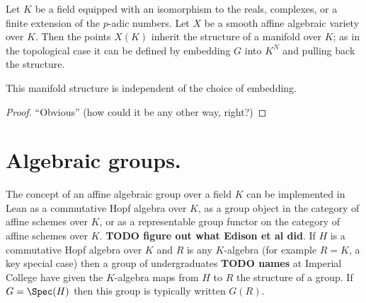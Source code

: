 \begin{definition}\label{manifold_on_algebraic_variety_points} Let $K$ be a field equipped with an isomorphism to the reals, complexes, or a finite extension of the $p$-adic numbers. Let $X$ be a smooth affine algebraic variety over $K$. Then the points $X(K)$ inherit the structure of a manifold over $K$; as in the topological case it can be defined by embedding $G$ into $K^N$ and pulling back the structure.
\end{definition}

\begin{theorem}\label{manifold_on_algebraic_variety_well_defined} This manifold structure is independent of the choice of embedding.
\end{theorem}
\begin{proof} ``Obvious'' (how could it be any other way, right?)
\end{proof}

\section{Algebraic groups.}

The concept of an affine algebraic group over a field $K$ can be implemented in Lean as a commutative Hopf algebra over $K$, as a group object in the category of affine schemes over $K$, or as a representable group functor on the category of affine schemes over $K$. {\bf TODO figure out what Edison et al did}. If $H$ is a commutative Hopf algebra over $K$ and $R$ is any $K$-algebra (for example $R=K$, a key special case) then a group of undergraduates {\bf TODO names} at Imperial College have given the $K$-algebra maps from $H$ to $R$ the structure of a group. If $G=\Spec(H)$ then this group is typically written $G(R)$. 



